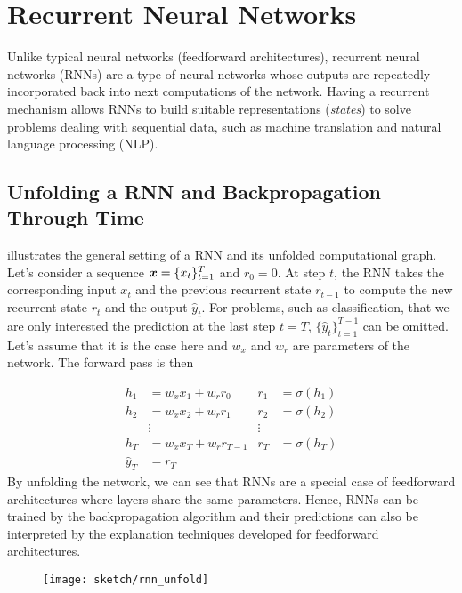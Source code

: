 \section{Recurrent Neural Networks}
Unlike typical neural networks (feedforward architectures), recurrent neural networks (RNNs) are a type of neural networks whose outputs are repeatedly incorporated back into next computations of the network. Having a recurrent mechanism allows RNNs to build suitable representations (\textit{states}) to solve problems dealing with sequential data,  such as machine translation and natural language processing (NLP).

\subsection{Unfolding a RNN and Backpropagation Through Time}
 
\addfigure{\ref{fig:rnn_unfold}} illustrates the general setting of a RNN and its unfolded computational graph. Let's consider a sequence $\boldsymbol{x}= \{ x_t \}_{t=1}^{T}$ and $r_0 = 0$.  At step $t$, the RNN takes  the corresponding input $x_{t}$ and the previous recurrent state $r_{t-1}$ to compute the new recurrent state $r_{t}$ and the output $\hat{y}_t$. For problems, such as classification, that we are only interested the prediction at the last step $t=T$, $\{ \hat{y}_t \}_{t=1}^{T-1}$ can be omitted. Let's assume that it is the case here and $w_x$ and $w_r$ are parameters of the network.  The forward pass is then

\begin{align*}
	h_1 &= w_{x} x_1 + w_{r} r_0 & r_1 &= \sigma(h_1)  \\
	h_2 &= w_{x} x_2 + w_{r} r_1 &  r_2 &= \sigma(h_2) \\
	& \vdots & \vdots \\
	h_{T} &= w_{x} x_{T} + w_{r} r_{T-1} &  r_{T} &= \sigma(h_{T}) \\
	\hat{y}_T &= r_T
\end{align*}
By unfolding the network,  we can see that RNNs are a special case of feedforward architectures where layers share the same parameters. Hence, RNNs can be trained by the backpropagation algorithm and their predictions can also be interpreted by the explanation techniques developed for feedforward architectures.


\begin{figure}
\centering
\texttt{[image: sketch/rnn\_unfold]}
\label{fig:rnn_unfold} 
\end{figure}

